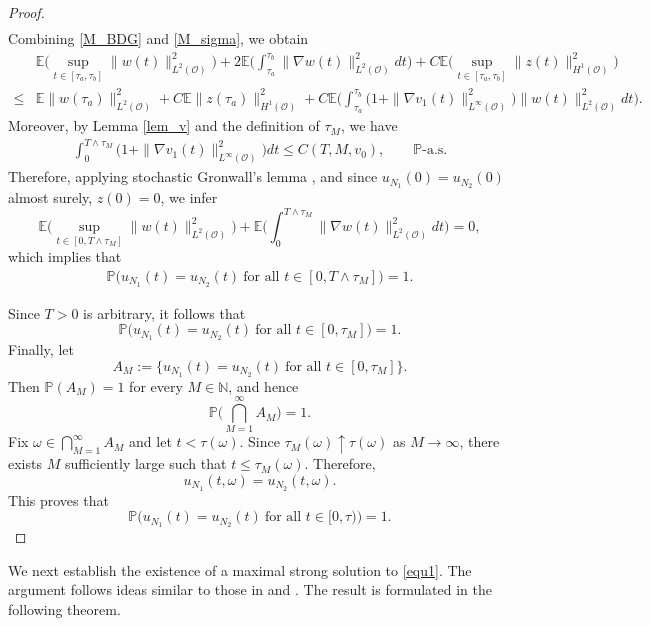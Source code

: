 \documentclass[reqno, 11pt]{amsart}
\theoremstyle{definition}
\numberwithin{equation}{section} \numberwithin{lem}{section}
\numberwithin{thm}{section} \numberwithin{prop}{section}
\numberwithin{cor}{section} \numberwithin{rem}{section}
\numberwithin{defn}{section}
\begin{document}
\begin{proof}
\begin{align}
\end{align}
 Combining \eqref{M_BDG} and  \eqref{M_sigma}, we obtain 
      \begin{align*}
&\mathbb{E}\Big(\sup_{t\in[\tau_a,\tau_b]}\|w({t})\|_{L^2(\mathcal {O})}^2\Big)+ 2\mathbb{E}\Big(\int_{{\tau_a}}^{{\tau_b}}\|\nabla w(t)\|_{L^2(\mathcal {O})}^2dt\Big)+C\mathbb{E}\Big(\sup_{t\in[\tau_a,\tau_b]}\|z({t})\|_{H^1(\mathcal {O})}^2\Big)\\\leq &\mathbb{E}\|w(\tau_a)\|_{L^2(\mathcal{O})}^2+C\mathbb{E}\|z(\tau_a)\|_{H^1(\mathcal{O})}^2+C\mathbb{E}\Big(\int_{{\tau_a}}^{{\tau_b}}\big(1+\|\nabla v_1(t)\|_{L^\infty (\mathcal{O})}^2\big)\|w(t)\|_{L^2(\mathcal {O})}^{2}dt\Big).
\end{align*}
Moreover, by Lemma \ref{lem_v} and the definition of $\tau_M$, we have 
\begin{align*}
    \int_{0}^{T\wedge\tau_M}\big(1+\|\nabla v_1(t)\|_{L^\infty (\mathcal{O})}^2\big)dt\le C(T,M,v_0),\qquad\mathbb{P}\text{-a.s.}
\end{align*}
Therefore, applying stochastic Gronwall's lemma \cite [Lemma 5.3]{glatt2009strong}, and since $u_{N_1}(0)=u_{N_2}(0)$ almost surely, $z(0)=0$,  we infer 
\[
\mathbb{E}\Big(\sup_{t\in[0,T\wedge\tau_M]}\|w({t})\|_{L^2(\mathcal {O})}^2\Big)+\mathbb{E}\Big(\int_0^{T\wedge{\tau_M}}\|\nabla w(t)\|_{L^2(\mathcal {O})}^2dt\Big)=0,
\]
which implies that 
\begin{align}\label{T_0}
    \mathbb{P}\Big(u_{N_1}(t)=u_{N_2}(t)\ \text{for all } t\in[0,T\wedge{\tau_M}]\Big)=1.
\end{align}

Since $T>0$ is arbitrary, it follows that
\[
\mathbb{P}\Big(
u_{N_1}(t)=u_{N_2}(t)\ \text{for all } t\in[0,\tau_M]
\Big)=1.
\]
Finally, let
\[
A_M:=\Big\{
u_{N_1}(t)=u_{N_2}(t)\ \text{for all } t\in[0,\tau_M]
\Big\}.
\]
Then $\mathbb{P}(A_M)=1$ for every $M\in\mathbb{N}$, and hence
\[
\mathbb{P}\Big(\bigcap_{M=1}^\infty A_M\Big)=1.
\]
Fix $\omega\in \bigcap_{M=1}^\infty A_M$ and let $t<\tau(\omega)$. Since $\tau_M(\omega)\uparrow\tau(\omega)$ as $M\to\infty$, there exists $M$ sufficiently large such that $t\le \tau_M(\omega)$. Therefore,
\[
u_{N_1}(t,\omega)=u_{N_2}(t,\omega).
\]
This proves that
\[
\mathbb{P}\Big(
u_{N_1}(t)=u_{N_2}(t)\ \text{for all } t\in[0,\tau)
\Big)=1.
\]
   \end{proof}
   We next establish the existence of a maximal strong solution to \eqref{equ1}. The argument follows ideas similar to those in \cite[Theorem~3.28]{kuehn2020pathwise} and \cite[Section~4]{chen2025well}. The result is formulated in the following theorem.  
\end{document}
